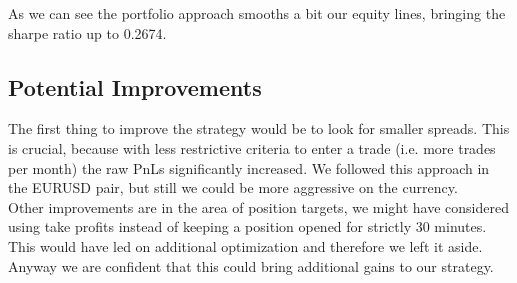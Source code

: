 \documentclass[a4paper]{article}
\begin{document}
	
As we can see the portfolio approach smooths a bit our equity lines, bringing the sharpe ratio up to 0.2674.\\


\subsection{Potential Improvements}

The first thing to improve the strategy would be to look for smaller spreads. This is crucial, because with less restrictive criteria to enter a trade (i.e. more trades per month) the raw PnLs significantly increased. We followed this approach in the EURUSD pair, but still we could be more aggressive on the currency.\\
Other improvements are in the area of position targets, we might have considered using take profits instead of keeping a position opened for strictly 30 minutes. This would have led on additional optimization and therefore we left it aside. Anyway we are confident that this could bring additional gains to our strategy.\\
\end{document}
